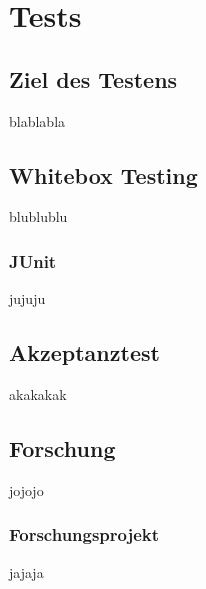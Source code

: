 \chapter{Tests}
\section{Ziel des Testens}
blablabla
\section{Whitebox Testing}
blublublu
\subsection{JUnit}
jujuju
\section{Akzeptanztest}
akakakak
\section{Forschung}
jojojo
\subsection{Forschungsprojekt}
jajaja